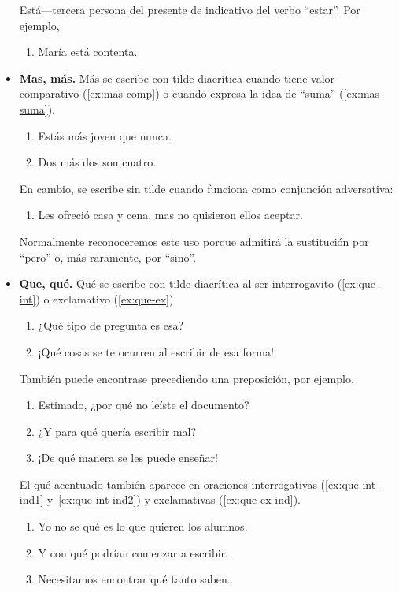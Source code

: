 \documentclass[twocolumn,11pts]{IEEEtran}
\begin{document}
\begin{itemize}
Está---tercera persona del presente de indicativo del verbo ``estar''. Por ejemplo, 
\begin{enumerate}[\itshape]
\item[] María está contenta.
\end{enumerate}

\item \textbf{Mas, más.} Más se escribe con tilde diacrítica cuando tiene valor comparativo (\ref{ex:mas-comp}) o cuando expresa la idea de ``suma'' (\ref{ex:mas-suma}).
\begin{enumerate}[\itshape]
\item\label{ex:mas-comp} Estás más joven que nunca.
\item\label{ex:mas-suma} Dos más dos son cuatro.
\end{enumerate}

En cambio, se escribe sin tilde cuando funciona como conjunción adversativa:
\begin{enumerate}[\itshape]
\item[] Les ofreció casa y cena, mas no quisieron ellos aceptar.
\end{enumerate}

Normalmente reconoceremos este uso porque admitirá la sustitución por ``pero'' o, más raramente, por ``sino''.

\item \textbf{Que, qué.} Qué se escribe con tilde diacrítica al ser interrogavito (\ref{ex:que-int}) o exclamativo (\ref{ex:que-ex}).
\begin{enumerate}[\itshape]
\item\label{ex:que-int} ¿Qué tipo de pregunta es esa?
\item\label{ex:que-ex} ¡Qué cosas se te ocurren al escribir de esa forma!
\end{enumerate}
También puede encontrase precediendo una preposición, por ejemplo,
\begin{enumerate}[\itshape]
\item[] Estimado, ¿por qué no leíste el documento?
\item[] ¿Y para qué quería escribir mal?
\item[] ¡De qué manera se les puede enseñar!
\end{enumerate}
El qué acentuado también aparece en oraciones interrogativas (\ref{ex:que-int-ind1} y~\ref{ex:que-int-ind2}) y exclamativas (\ref{ex:que-ex-ind}).
\begin{enumerate}[\itshape]
\item\label{ex:que-int-ind1} Yo no se qué es lo que quieren los alumnos.
\item\label{ex:que-int-ind2} Y con qué podrían comenzar a escribir.
\item\label{ex:que-ex-ind} Necesitamos encontrar qué tanto saben.
\end{enumerate}


\end{itemize}
\end{document}
